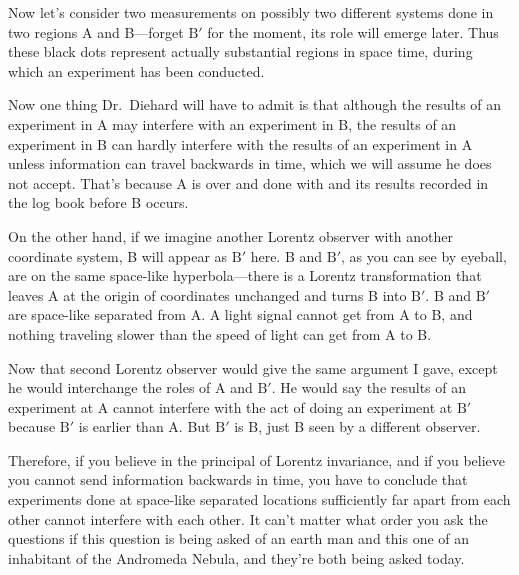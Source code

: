 \documentclass[12pt,nofootinbib]{revtex4}
\begin{document}
Now let's consider two measurements on possibly two different systems done in two regions A and B---forget $\textrm{B}'$ for the moment, its role will emerge later. Thus these black dots represent actually substantial regions in space time, during which an experiment has been conducted.

Now one thing Dr.\ Diehard will have to admit is that although the results of an experiment in A may interfere with an experiment in B, the results of an experiment in B can hardly interfere with the results of an experiment in A unless information can travel backwards in time, which we will assume he does not accept. That's because A is over and done with and its results recorded in the log book before B occurs.

On the other hand, if we imagine another Lorentz observer with another coordinate system, B will appear as $\textrm{B}'$ here. B and $\textrm{B}'$, as you can see by eyeball, are on the same space-like hyperbola---there is a Lorentz transformation that leaves A at the origin of coordinates unchanged and turns B into $\textrm{B}'$. B and $\textrm{B}'$ are space-like separated from A. A light signal cannot get from A to B, and nothing traveling slower than the speed of light can get from A to B.

Now that second Lorentz observer would give the same argument I gave, except he would interchange the roles of A and $\textrm{B}'$. He would say the results of an experiment at A cannot interfere with the act of doing an experiment at $\textrm{B}'$ because $\textrm{B}'$ is earlier than A. But $\textrm{B}'$ is B, just B seen by a different observer.

Therefore, if you believe in the principal of Lorentz invariance, and if you believe you cannot send information backwards in time, you have to conclude that experiments done at space-like separated locations sufficiently far apart from each other cannot interfere with each other. It can't matter what order you ask the questions if this question is being asked of an earth man and this one of an inhabitant of the Andromeda Nebula, and they're both being asked today.
\end{document}
